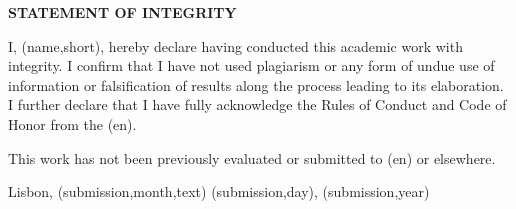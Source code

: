 
%

\thispagestyle{empty}

\begingroup
\setlength{\parskip}{1ex plus 1pt minus 1pt}
\setlength{\parindent}{0cm}
\begin{center}
  \textbf{STATEMENT OF INTEGRITY}
\end{center}

I, \thedocauthor(name,short), hereby declare having conducted this academic work with integrity. 
I confirm that I have not used plagiarism or any form of undue use of information or falsification of results along the process leading to its elaboration. 
I further declare that I have fully acknowledge the Rules of Conduct and Code of Honor from the \theschool(en).

This work has not been previously evaluated or submitted to \theschool(en) or elsewhere.

\bigskip

Lisbon, \thentdocdate(submission,month,text) \thentdocdate(submission,day), \thentdocdate(submission,year)%

\endgroup
\clearforchapter
